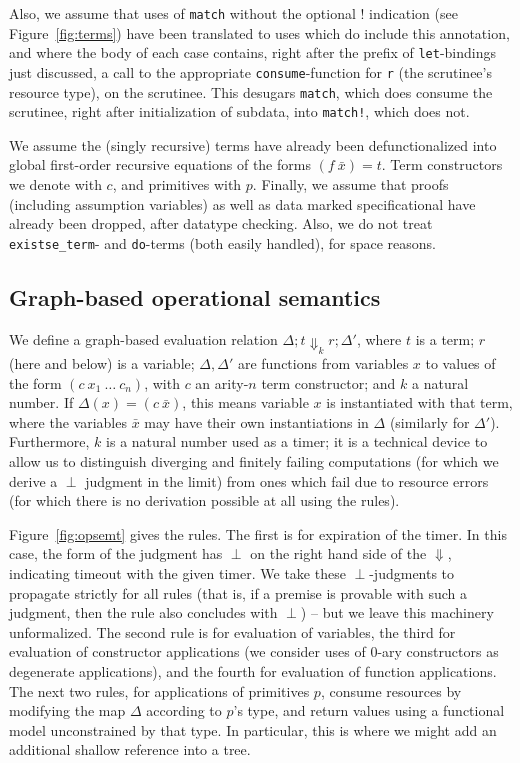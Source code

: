 \documentclass[9pt,natbib]{sigplanconf}
\begin{document}
\noindent Also, we assume that uses of \texttt{match} without the
optional $!$ indication (see Figure~\ref{fig:terms}) have been
translated to uses which do include this annotation, and where the
body of each case contains, right after the prefix of
\texttt{let}-bindings just discussed, a call to the appropriate
\texttt{consume}-function for \texttt{r} (the scrutinee's resource
type), on the scrutinee.  This desugars \texttt{match}, which does
consume the scrutinee, right after initialization of subdata, into
\texttt{match!}, which does not.  

We assume the (singly recursive) terms have already been
defunctionalized into global first-order recursive equations of the
forms $(f\ \bar{x}) = t$.  Term constructors we denote with $c$, and
primitives with $p$. Finally, we assume that proofs (including
assumption variables) as well as data marked specificational have
already been dropped, after datatype checking.  Also, we do not treat
\texttt{existse\_term}- and \texttt{do}-terms (both easily handled),
for space reasons.

\subsection{Graph-based operational semantics}

We define a graph-based evaluation relation $\Delta; t \Downarrow_k r;
\Delta'$, where $t$ is a term; $r$ (here and below) is a variable;
$\Delta, \Delta'$ are functions from variables $x$ to values of the
form $(c\ x_1\ \ldots\ c_n)$, with $c$ an arity-$n$ term constructor;
and $k$ a natural number.  If $\Delta(x) = (c\ \bar{x})$, this means
variable $x$ is instantiated with that term, where the variables
$\bar{x}$ may have their own instantiations in $\Delta$ (similarly for
$\Delta'$).  Furthermore, $k$ is a natural number used as a timer; it
is a technical device to allow us to distinguish diverging and
finitely failing computations (for which we derive a $\perp$ judgment
in the limit) from ones which fail due to resource errors (for which
there is no derivation possible at all using the rules).

Figure~\ref{fig:opsemt} gives the rules.  The first is for expiration
of the timer.  In this case, the form of the judgment has $\perp$ on
the right hand side of the $\Downarrow$, indicating timeout with the
given timer.  We take these $\perp$-judgments to propagate strictly
for all rules (that is, if a premise is provable with such a judgment,
then the rule also concludes with $\perp$) -- but we leave this
machinery unformalized.  The second rule is for evaluation of
variables, the third for evaluation of constructor applications (we
consider uses of 0-ary constructors as degenerate applications), and
the fourth for evaluation of function applications.  The next two
rules, for applications of primitives $p$, consume resources by
modifying the map $\Delta$ according to $p$'s type, and return values
using a functional model unconstrained by that type.  In particular,
this is where we might add an additional shallow reference into a tree.
\end{document}
